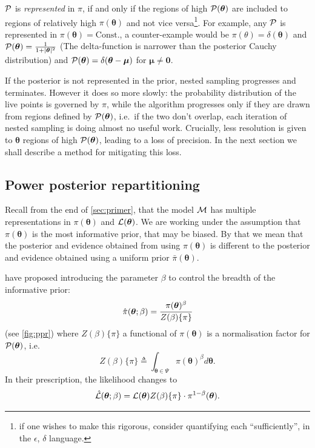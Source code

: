 \documentclass[usenatbib]{mnras}
\begin{document}
${\cal P}$ is \emph{represented} in $\pi$, if and only if the regions
of high ${\cal P}(\bm{\theta})$ are included to regions of relatively
high $\pi(\bm{\theta})$ and not vice versa\footnote{if one wishes to
  make this rigorous, consider quantifying each ``sufficiently'', in
  the $\epsilon$, $\delta$ language. }. For example, any ${\cal P}$ is
represented in $\pi(\bm{\theta}) = \text{Const.}$, a counter-example
would be $\pi(\theta) = \delta(\bm{\theta})$ and
${\cal P}(\bm{\theta}) = \frac{1}{1 + |\bm{\theta}|^{2}}$ (The
delta-function is narrower than the posterior Cauchy distribution) and
${\cal P}(\bm{\theta}) = \delta(\bm{\theta} - \bm{\mu})$ for
$\bm{\mu} \ne \bm{0}$.

If the posterior is not represented in the prior, nested sampling
progresses and terminates. However it does so more slowly: the
probability distribution of the live points is governed by $\pi$,
while the algorithm progresses only if they are drawn from regions
defined by \( {\cal P} (\bm{\theta})\), i.e.~if the two don't overlap,
each iteration of nested sampling is doing almost no useful
work. Crucially, less resolution is given to $\bm{\theta}$ regions of
high \( {\cal P} (\bm{\theta})\), leading to a loss of precision. In
the next section we shall describe a method for mitigating this loss.


\subsection{Power posterior repartitioning}\label{sec:autopr}

Recall from the end of \cref{sec:primer}, that the model ${\cal M}$
has multiple representations in \(\pi (\bm{\theta})\) and
\({\cal L}(\bm{\theta})\). We are working under the assumption that
$\pi(\bm{\theta})$ is the most informative prior, that may be
biased. By that we mean that the posterior and evidence obtained from
using $\pi(\bm{\theta})$ is different to the posterior and evidence
obtained using a uniform prior \(\bar{\pi}(\bm{\theta})\).

\cite{chen-ferroz-hobson} have proposed introducing the parameter
\(\beta\) to control the breadth of the informative prior:
\begin{equation}
  \label{eq:autopr-prior}
  \hat{\pi}(\bm{\bm{\theta}};\beta) = \cfrac{\pi(\bm{\theta})^{\beta}}{Z(\beta)\{\pi\}}
\end{equation}
(see \cref{fig:ppr}) where \(Z(\beta)\{\pi\}\) a functional of
\(\pi (\bm{\theta})\) is a normalisation factor for
\( {\cal P} (\bm{\theta})\), i.e.
\begin{equation}
  Z(\beta)\{\pi\} \triangleq \int_{\bm{\theta} \in \Psi} \pi(\bm{\bm{\theta}})^{\beta}d\bm{\bm{\theta}}.
\end{equation}
In their prescription, the likelihood changes to
\begin{equation}
  \hat{\cal L}(\bm{\theta}; \beta) = {\cal L}(\bm{\theta}) Z(\beta)\{\pi\} \cdot \pi^{1-\beta}(\bm{\theta}).
\end{equation}
\end{document}
